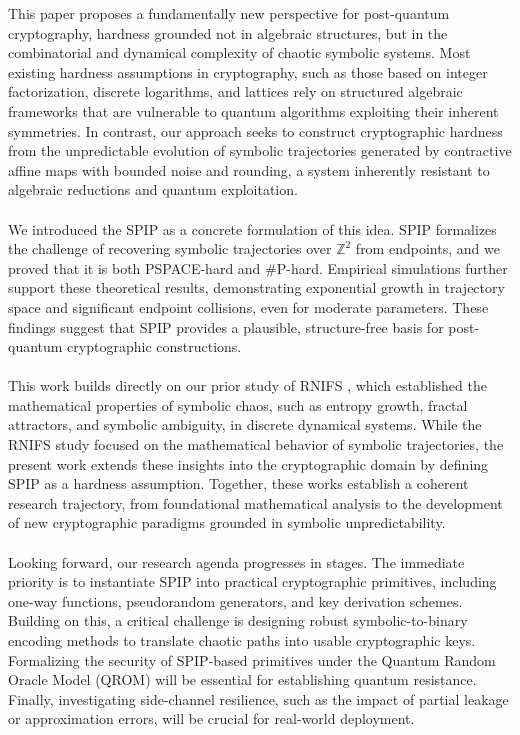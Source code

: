 \documentclass[twocolumn,10pt]{article}
\begin{document}
This paper proposes a fundamentally new perspective for post-quantum cryptography, hardness grounded not in algebraic structures, but in the combinatorial and dynamical complexity of chaotic symbolic systems. Most existing hardness assumptions in cryptography, such as those based on integer factorization, discrete logarithms, and lattices rely on structured algebraic frameworks that are vulnerable to quantum algorithms exploiting their inherent symmetries. In contrast, our approach seeks to construct cryptographic hardness from the unpredictable evolution of symbolic trajectories generated by contractive affine maps with bounded noise and rounding, a system inherently resistant to algebraic reductions and quantum exploitation. \\\\ We introduced the SPIP as a concrete formulation of this idea. SPIP formalizes the challenge of recovering symbolic trajectories over $\mathbb{Z}^2$ from endpoints, and we proved that it is both PSPACE-hard and \#P-hard. Empirical simulations further support these theoretical results, demonstrating exponential growth in trajectory space and significant endpoint collisions, even for moderate parameters. These findings suggest that SPIP provides a plausible, structure-free basis for post-quantum cryptographic constructions.\\\\ This work builds directly on our prior study of RNIFS \cite{bouke2025rnifs}, which established the mathematical properties of symbolic chaos, such as entropy growth, fractal attractors, and symbolic ambiguity, in discrete dynamical systems. While the RNIFS study focused on the mathematical behavior of symbolic trajectories, the present work extends these insights into the cryptographic domain by defining SPIP as a hardness assumption. Together, these works establish a coherent research trajectory, from foundational mathematical analysis to the development of new cryptographic paradigms grounded in symbolic unpredictability.  \\\\Looking forward, our research agenda progresses in stages. The immediate priority is to instantiate SPIP into practical cryptographic primitives, including one-way functions, pseudorandom generators, and key derivation schemes. Building on this, a critical challenge is designing robust symbolic-to-binary encoding methods to translate chaotic paths into usable cryptographic keys. Formalizing the security of SPIP-based primitives under the Quantum Random Oracle Model (QROM) will be essential for establishing quantum resistance. Finally, investigating side-channel resilience, such as the impact of partial leakage or approximation errors, will be crucial for real-world deployment.
\end{document}
